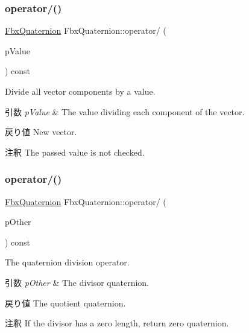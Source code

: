 \subsubsection{\texorpdfstring{operator/()}{operator/()}\hspace{0.1cm}{\footnotesize\ttfamily [1/2]}}
{\footnotesize\ttfamily \hyperlink{class_fbx_quaternion}{Fbx\+Quaternion} Fbx\+Quaternion\+::operator/ (\begin{DoxyParamCaption}\item[{double}]{p\+Value }\end{DoxyParamCaption}) const}

Divide all vector components by a value. 
\begin{DoxyParams}{引数}
{\em p\+Value} & The value dividing each component of the vector. \\
\hline
\end{DoxyParams}
\begin{DoxyReturn}{戻り値}
New vector. 
\end{DoxyReturn}
\begin{DoxyRemark}{注釈}
The passed value is not checked. 
\end{DoxyRemark}
\mbox{\label{class_fbx_quaternion_aeb9ff1e0023e789f0e2cb872116401f6}} 
\subsubsection{\texorpdfstring{operator/()}{operator/()}\hspace{0.1cm}{\footnotesize\ttfamily [2/2]}}
{\footnotesize\ttfamily \hyperlink{class_fbx_quaternion}{Fbx\+Quaternion} Fbx\+Quaternion\+::operator/ (\begin{DoxyParamCaption}\item[{const \hyperlink{class_fbx_quaternion}{Fbx\+Quaternion} \&}]{p\+Other }\end{DoxyParamCaption}) const}

The quaternion division operator. 
\begin{DoxyParams}{引数}
{\em p\+Other} & The divisor quaternion. \\
\hline
\end{DoxyParams}
\begin{DoxyReturn}{戻り値}
The quotient quaternion. 
\end{DoxyReturn}
\begin{DoxyRemark}{注釈}
If the divisor has a zero length, return zero quaternion. 
\end{DoxyRemark}
\mbox{\label{class_fbx_quaternion_a01b691edc7aeac6565987ff372d105c9}} 
